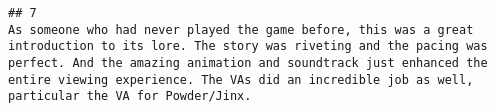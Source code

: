 \documentclass[
]{article}
\begin{document}
\begin{verbatim}
## 7                                                                                                                                                                                                                                                                                                                                                                                                                                                                                                                                                                                                                                                                                                                                                                                                                                                                                                                                                                                                                                                                                                                                                                                                                                                                                                                                                                                                                                                                                                                                                                                                                                                                                                                                                                                                                                                                                                                                                                                                                                                                                                                                                                                                                                                                                                                                                                                                                                                                                                                                                                                                                                                                                                                                                    As someone who had never played the game before, this was a great introduction to its lore. The story was riveting and the pacing was perfect. And the amazing animation and soundtrack just enhanced the entire viewing experience. The VAs did an incredible job as well, particular the VA for Powder/Jinx.

\end{verbatim}
\end{document}
